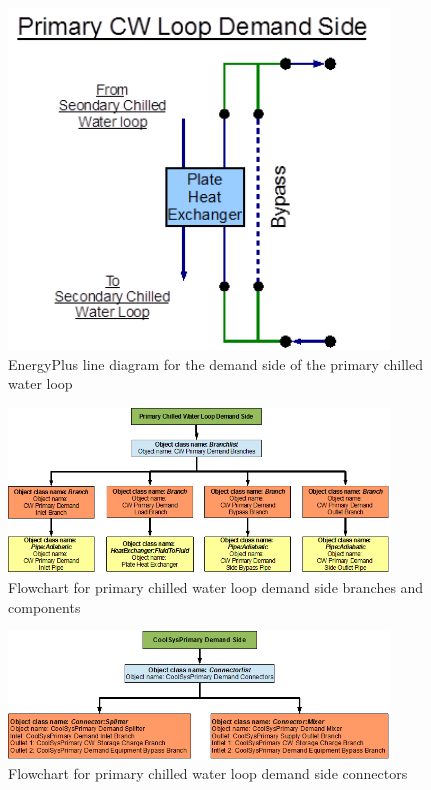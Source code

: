\begin{figure}[hbtp] %
\centering
\includegraphics[width=0.9\textwidth, height=0.9\textheight, keepaspectratio=true]{media/image096.png}
\caption{EnergyPlus line diagram for the demand side of the primary chilled water loop \protect \label{fig:energyplus-line-diagram-for-the-demand-side-005}}
\end{figure}

\begin{figure}[hbtp] %
\centering
\includegraphics[width=0.9\textwidth, height=0.9\textheight, keepaspectratio=true]{media/image097.png}
\caption{Flowchart for primary chilled water loop demand side branches and components \protect \label{fig:flowchart-for-primary-chilled-water-loop-demand-side-branches-and-components}}
\end{figure}

\begin{figure}[hbtp] %
\centering
\includegraphics[width=0.9\textwidth, height=0.9\textheight, keepaspectratio=true]{media/image098.png}
\caption{Flowchart for primary chilled water loop demand side connectors \protect \label{fig:flowchart-for-primary-chilled-water-loop-demand-side-connectors}}
\end{figure}

